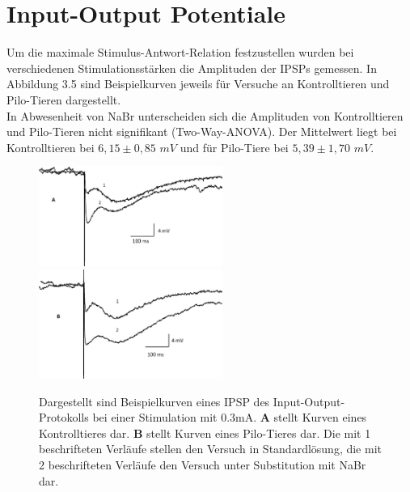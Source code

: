 \documentclass[a4paper,11pt]{report}
\begin{document}
{%



\section{Input-Output Potentiale}
Um die maximale Stimulus-Antwort-Relation festzustellen wurden bei verschiedenen Stimulationsstärken die Amplituden der IPSPs gemessen. In Abbildung 3.5 sind Beispielkurven jeweils für Versuche an Kontrolltieren und Pilo-Tieren dargestellt.\\


In Abwesenheit von NaBr unterscheiden sich die Amplituden von Kontrolltieren und Pilo-Tieren nicht signifikant (Two-Way-ANOVA). Der Mittelwert liegt bei Kontrolltieren bei $6,15 \pm 0,85$ $mV$ und für Pilo-Tiere bei $5,39 \pm 1,70$ $mV$.\\

\begin{figure}[H]
\begin{center}
\includegraphics[width=6cm]{Abbildungen/inout_kontrolle_sample.jpg}
\includegraphics[width=6cm]{Abbildungen/inout_pilo_sample.jpg}
\caption{Dargestellt sind Beispielkurven eines IPSP des Input-Output-Protokolls bei einer Stimulation mit 0.3mA. \textbf{A}  stellt Kurven eines Kontrolltieres dar. \textbf{B} stellt Kurven eines Pilo-Tieres dar. Die mit 1 beschrifteten Verläufe stellen den Versuch in Standardlösung, die mit 2 beschrifteten Verläufe den Versuch unter Substitution mit NaBr dar.}
\end{center}
\end{figure}




}
\end{document}
